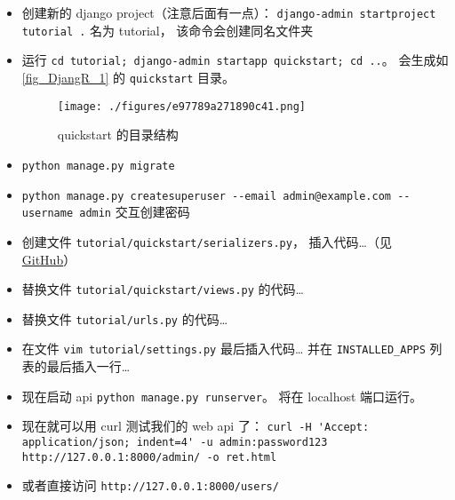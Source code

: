 \begin{itemize}
\item 创建新的 django project（注意后面有一点）： \verb`django-admin startproject tutorial .` 名为 tutorial， 该命令会创建同名文件夹
\item 运行 \verb`cd tutorial; django-admin startapp quickstart; cd ..`。 会生成如\autoref{fig_DjangR_1} 的 \verb`quickstart` 目录。
\begin{figure}[ht]
\centering
\texttt{[image: ./figures/e97789a271890c41.png]}
\caption{quickstart 的目录结构} \label{fig_DjangR_1}
\end{figure}
\item \verb`python manage.py migrate`
\item \verb`python manage.py createsuperuser --email admin@example.com --username admin` 交互创建密码
\item 创建文件 \verb`tutorial/quickstart/serializers.py`， 插入代码…（见 \href{https://github.com/MacroUniverse/django-test}{GitHub}）
\item 替换文件 \verb`tutorial/quickstart/views.py` 的代码…
\item 替换文件 \verb`tutorial/urls.py` 的代码…
\item 在文件 \verb`vim tutorial/settings.py` 最后插入代码… 并在 \verb`INSTALLED_APPS` 列表的最后插入一行…
\item 现在启动 api \verb`python manage.py runserver`。 将在 localhost 端口运行。
\item 现在就可以用 curl 测试我们的 web api 了： \verb`curl -H 'Accept: application/json; indent=4' -u admin:password123 http://127.0.0.1:8000/admin/ -o ret.html`
\item 或者直接访问 \verb`http://127.0.0.1:8000/users/`
\end{itemize}
